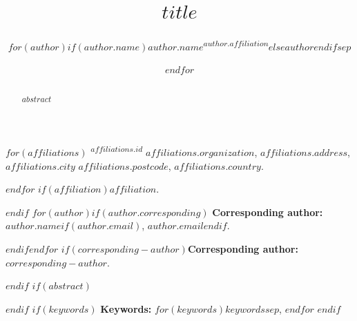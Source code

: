 \documentclass{article}
\title{$title$}
\author{$for(author)$$if(author.name)$$author.name$\textsuperscript{$author.affiliation$}$else$$author$$endif$$sep$ \and $endfor$}
\begin{document}
\maketitle
$for(affiliations)$
\noindent\textsuperscript{$affiliations.id$} $affiliations.organization$, $affiliations.address$, $affiliations.city$ $affiliations.postcode$, $affiliations.country$.\par
$endfor$
$if(affiliation)$\noindent $affiliation$.\par$endif$
$for(author)$$if(author.corresponding)$
\noindent\textbf{Corresponding author:} $author.name$$if(author.email)$, $author.email$$endif$.\par
$endif$$endfor$
$if(corresponding-author)$\noindent\textbf{Corresponding author:} $corresponding-author$.\par$endif$
$if(abstract)$
\begin{abstract}
$abstract$
\end{abstract}
$endif$
$if(keywords)$
\noindent\textbf{Keywords:} $for(keywords)$$keywords$$sep$, $endfor$
$endif$
\end{document}
